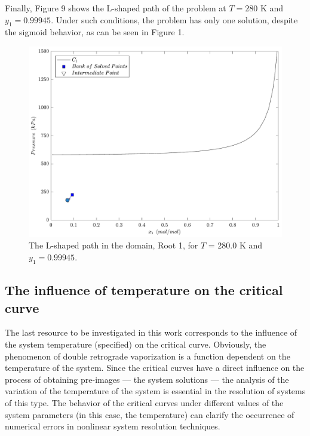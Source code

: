 \documentclass[journal=iecred,manuscript=article]{achemso}
\theoremstyle{definition}
\theoremstyle{remark}
\begin{document}
Finally, Figure 9 shows the L-shaped path of the problem at $T = 280$ K and $y_1 = 0.99945$. Under such conditions, the problem has only one solution, despite the sigmoid behavior, as can be seen in Figure 1.

\begin{figure}[!ht]
	\begin{center}
		\includegraphics[scale=0.50]{caminhos_L_degeneracao_dominio3.pdf}
		\caption{The L-shaped path in the domain, Root 1, for $T$ = 280.0 K and $y_1 = 0.99945$.}\label{fig:L_S2}
	\end{center}
\end{figure}


\subsection{The influence of temperature on the critical curve}

The last resource to be investigated in this work corresponds to the influence of the system temperature (specified) on the critical curve. Obviously, the phenomenon of double retrograde vaporization is a function dependent on the temperature of the system. Since the critical curves have a direct influence on the process of obtaining pre-images --- the system solutions --- the analysis of the variation of the temperature of the system is essential in the resolution of systems of this type. The behavior of the critical curves under different values of the system parameters (in this case, the temperature) can clarify the occurrence of numerical errors in nonlinear system resolution techniques.
\end{document}
